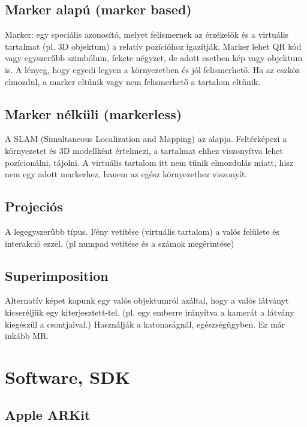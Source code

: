 \documentclass[a4paper,12pt]{article}
\begin{document}
\subsection{Marker alapú (marker based)}

Marker:  egy speciális azonosító, melyet  felismernek az érzékelők és a virtuális tartalmat (pl. 3D objektum) a relatív pozícióhoz igazítják.
Marker lehet QR kód vagy egyszerűbb szimbólum, fekete négyzet, de adott esetben kép vagy objektum is. A lényeg, hogy egyedi legyen a környezetben és jól felismerhető.
Ha az eszköz elmozdul, a marker eltűnik vagy nem felismerhető a tartalom eltűnik.

\subsection{Marker nélküli (markerless)}

A SLAM (Simultaneous Localization and Mapping) az alapja. 
Feltérképezi a környezetet és 3D modellként értelmezi, a tartalmat ehhez viszonyítva lehet pozícionálni, tájolni. A virtuális tartalom itt nem tűnik elmozdulás miatt, hisz nem egy adott markerhez, hanem az egész környezethez viszonyít.

\subsection{Projeciós}

A legegyszerűbb típus. Fény vetítése (virtuális tartalom) a valós felülete és interakció ezzel. (pl numpad vetítése és a számok megérintése)

\subsection{Superimposition}

Alternatív képet kapunk egy valós objektumról azáltal, hogy a valós látványt kicseréljük egy kiterjesztett-tel. (pl. egy emberre irányítva a kamerát a látvány kiegészül a csontjaival.) Használják a katonaságnál, egészségügyben. Ez már inkább MR. 

\section{Software, SDK}

\subsection{Apple ARKit}
\end{document}
